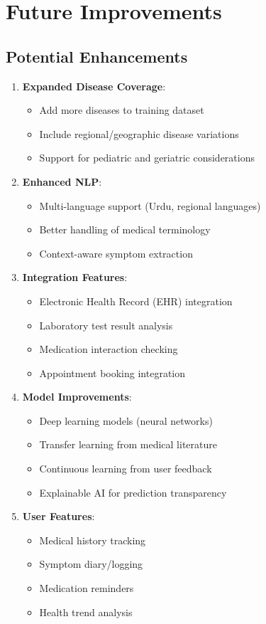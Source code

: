 \section{Future Improvements}
\subsection{Potential Enhancements}
\begin{enumerate}
    \item \textbf{Expanded Disease Coverage}:
    \begin{itemize}
        \item Add more diseases to training dataset
        \item Include regional/geographic disease variations
        \item Support for pediatric and geriatric considerations
    \end{itemize}
    
    \item \textbf{Enhanced NLP}:
    \begin{itemize}
        \item Multi-language support (Urdu, regional languages)
        \item Better handling of medical terminology
        \item Context-aware symptom extraction
    \end{itemize}
    
    \item \textbf{Integration Features}:
    \begin{itemize}
        \item Electronic Health Record (EHR) integration
        \item Laboratory test result analysis
        \item Medication interaction checking
        \item Appointment booking integration
    \end{itemize}
    
    \item \textbf{Model Improvements}:
    \begin{itemize}
        \item Deep learning models (neural networks)
        \item Transfer learning from medical literature
        \item Continuous learning from user feedback
        \item Explainable AI for prediction transparency
    \end{itemize}
    
    \item \textbf{User Features}:
    \begin{itemize}
        \item Medical history tracking
        \item Symptom diary/logging
        \item Medication reminders
        \item Health trend analysis
    \end{itemize}
\end{enumerate}

